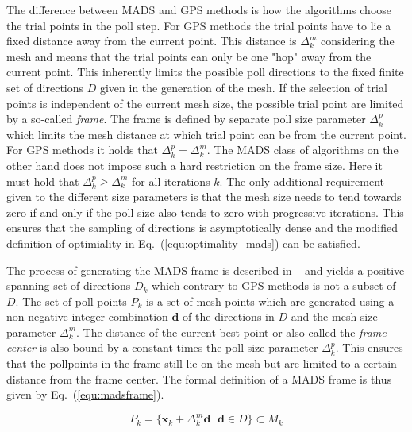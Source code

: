 \documentclass[a4paper,10pt]{article}
\renewcommand{\vec}[1]{\mathbf{#1}}
\newcommand{\equref}[1]{Eq.~(\ref{#1})}
\begin{document}
    The difference between MADS and GPS methods is how the algorithms choose
    the trial points in the poll step.
    For GPS methods the trial points have to lie a fixed distance away from
    the current point.
    This distance is $\Delta^m_k$ considering the mesh and means that
    the trial points can only be one "hop" away from the current point.
    This inherently limits the possible poll directions to the fixed finite
    set of directions $D$ given in the generation of the mesh.
    If the selection of trial points is independent of the current mesh
    size, the possible trial point are limited by a so-called \emph{frame}.
    The frame is defined by separate poll size parameter $\Delta^p_k$
    which limits the mesh distance at which trial point can be from
    the current point.
    For GPS methods it holds that $\Delta^p_k = \Delta^m_k$.
    The MADS class of algorithms on the other hand does not impose such
    a hard restriction on the frame size.
    Here it must hold that $\Delta^p_k \geq \Delta^m_k$ for all iterations $k$.
    The only additional requirement given to the different size parameters is
    that the mesh size needs to tend towards zero if and only if the 
    poll size also tends to zero with progressive iterations.
    This ensures that the sampling of directions is asymptotically dense
    and the modified definition of optimiality in \equref{equ:optimality_mads}
    can be satisfied. 
    
    The process of generating the MADS frame is described in ~\cite{mads_original}
    and yields a positive spanning set of directions $D_k$ which contrary to
    GPS methods is \underline{not} a subset of $D$.
    The set of poll points $P_k$ is a set of mesh points which are generated
    using a non-negative integer combination $\vec{d}$ of the directions in $D$
    and the mesh size parameter $\Delta^m_k$.
    The distance of the current best point or also called the \emph{frame center}
    is also bound by a constant times the poll size parameter $\Delta^p_k$.
    This ensures that the pollpoints in the frame still lie on the mesh
    but are limited to a certain distance from the frame center.
    The formal definition of a MADS frame is thus given by \equref{equ:madsframe}.

    \begin{equation}
        \label{equ:madsframe}
        P_k = \{\vec{x}_k + \Delta^m_k \vec{d} \, | \, \vec{d} \in D\} \subset M_k
    \end{equation}
\end{document}
